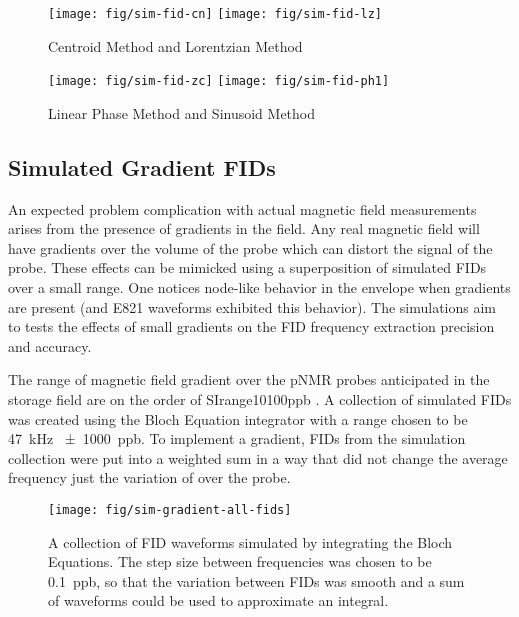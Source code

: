 \begin{figure}
    \label{fig:sim-fid-spectral}
    \texttt{[image: fig/sim-fid-cn]}
    \texttt{[image: fig/sim-fid-lz]}
    \caption{Centroid Method and Lorentzian Method}
\end{figure}

\begin{figure}
    \label{fig:sim-fid-time-domain}
    \texttt{[image: fig/sim-fid-zc]}
    \texttt{[image: fig/sim-fid-ph1]}
    \caption{Linear Phase Method and Sinusoid Method}
\end{figure}


\subsection{Simulated Gradient FIDs}
An expected problem complication with actual magnetic field measurements arises from the presence of gradients in the field.  Any real magnetic field will have gradients over the volume of the probe which can distort the signal of the probe.  These effects can be mimicked using a superposition of simulated FIDs over a small range.  One notices node-like behavior in the envelope when gradients are present (and E821 waveforms exhibited this behavior).  The simulations aim to tests the effects of small gradients on the FID frequency extraction precision and accuracy.

The range of magnetic field gradient over the pNMR probes anticipated in the \gmtwo storage field are on the order of SIrange{10}{100}{ppb} . A collection of simulated FIDs was created using the Bloch Equation integrator with a range chosen to be \SI{47}{\kHz} \SI{\pm 1000}{ppb}. To implement a gradient, FIDs from the simulation collection were put into a weighted sum in a way that did not change the average frequency just the variation of over the probe.

\begin{figure}
\label{fig:sim-gradient-all-fids}
\texttt{[image: fig/sim-gradient-all-fids]}
\caption{A collection of FID waveforms simulated by integrating the Bloch Equations.  The step size between frequencies was chosen to be \SI{0.1}{ppb}, so that the variation between FIDs was smooth and a sum of waveforms could be used to approximate an integral.}
\end{figure}

